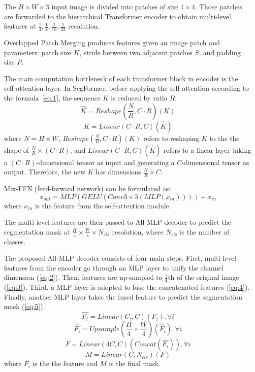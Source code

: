 The $H\times W \times 3$ input image is divided into patches of size $4\times 4$. Those patches are forwarded to the hierarchical Transformer encoder to obtain multi-level features at $\frac{1}{4}, \frac{1}{8}, \frac{1}{16}, \frac{1}{32}$ resolution.

Overlapped Patch Merging produces features given an image patch and parameters: patch size $K$, stride between two adjacent patches $S$, and padding size $P$.

The main computation bottleneck of each transformer block in encoder is the self-attention layer. In SegFormer, before applying the self-attention according to the formula~\ref{eq:1}, the sequence $K$ is reduced by ratio $R$:
$$\hat{K} = Reshape(\frac{N}{R}, C\cdot R)(K)$$
$$K = Linear(C \cdot R, C)(\hat{K})$$
where $N = H \times W$, $Reshape(\frac{N}{R}, C \cdot R)(K)$ refers to reshaping $K$ to the the shape of $\frac{N}{R} \times (C \cdot R)$, and $Linear(C \cdot R, C)(\hat{K})$ refers to a linear layer taking a $(C \cdot R)$-dimensional tensor as input and generating a $C$-dimensional tensor as output. Therefore, the new $K$ has dimensions $\frac{N}{R} \times C$.  

Mix-FFN (feed-forward network) can be formulated as:
$$x_{out} = MLP(GELU(Conv 3\times 3(MLP(x_{in})))) + x_{in}$$
where $x_{in}$ is the feature from the self-attention module.

The multi-level features are then passed to All-MLP decoder to predict the segmentation mask at $\frac{H}{4}\times \frac{W}{4}\times N_{cls}$ resolution, where $N_{cls}$ is the number of classes.

The proposed All-MLP decoder consists of four main steps. First, multi-level features from
the encoder go through an MLP layer to unify the channel dimension (\ref{eq:2}). Then, features are up-sampled to $\frac{1}{4}$th of the original image (\ref{eq:3}). Third, a MLP layer is adopted to fuse the concatenated features (\ref{eq:4}). Finally, another MLP layer takes the fused feature to predict the segmentation mask (\ref{eq:5}).
\begin{equation} \label{eq:2}
\hat{F_i} = Linear(C_i, C)(F_i), \forall i
\end{equation}
\begin{equation} \label{eq:3}
\hat{F_i} = Upsample(\frac{H}{4}\times \frac{W}{4})(\hat{F_i}), \forall i
\end{equation}
\begin{equation} \label{eq:4}
F = Linear(4C, C)(Concat(\hat{F_i})), \forall i
\end{equation}
\begin{equation} \label{eq:5}
M = Linear(C, N_{cls})(F)
\end{equation}
where $F_i$ is the the feature and $M$ is the final mask.